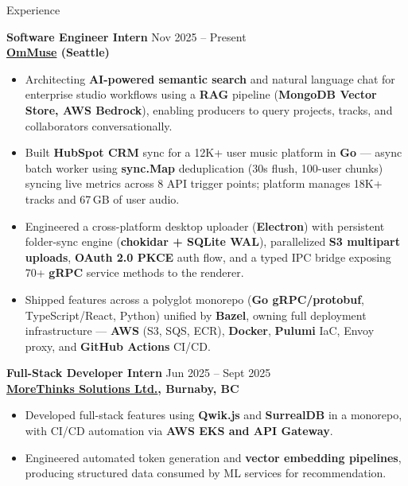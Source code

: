 \documentclass{resume}
\begin{document}
\begin{rSection}{Experience}

\scriptsize \textbf{Software Engineer Intern} \hfill Nov 2025 -- Present\\
\textbf{\href{https://ommuse.com/}{OmMuse} (Seattle)}
\begin{itemize}\itemsep -4pt
    \item Architecting \textbf{AI-powered semantic search} and natural language chat for enterprise studio workflows using a \textbf{RAG} pipeline (\textbf{MongoDB Vector Store, AWS Bedrock}), enabling producers to query projects, tracks, and collaborators conversationally.
    \item Built \textbf{HubSpot CRM} sync for a 12K+ user music platform in \textbf{Go} --- async batch worker using \textbf{sync.Map} deduplication (30s flush, 100-user chunks) syncing live metrics across 8 API trigger points; platform manages 18K+ tracks and 67\,GB of user audio.
    \item Engineered a cross-platform desktop uploader (\textbf{Electron}) with persistent folder-sync engine (\textbf{chokidar + SQLite WAL}), parallelized \textbf{S3 multipart uploads}, \textbf{OAuth 2.0 PKCE} auth flow, and a typed IPC bridge exposing 70+ \textbf{gRPC} service methods to the renderer.
    \item Shipped features across a polyglot monorepo (\textbf{Go gRPC/protobuf}, TypeScript/React, Python) unified by \textbf{Bazel}, owning full deployment infrastructure --- \textbf{AWS} (S3, SQS, ECR), \textbf{Docker}, \textbf{Pulumi} IaC, Envoy proxy, and \textbf{GitHub Actions} CI/CD.
\end{itemize}

\scriptsize \textbf{Full-Stack Developer Intern} \hfill Jun 2025 -- Sept 2025\\
  \textbf{\href{https://morethinks.com/}{MoreThinks Solutions Ltd.}, Burnaby, BC}
  \begin{itemize}\itemsep -4pt
    \item Developed full-stack features using \textbf{Qwik.js} and \textbf{SurrealDB} in a monorepo, with CI/CD automation via \textbf{AWS EKS and API Gateway}.
    \item Engineered automated token generation and \textbf{vector embedding pipelines}, producing structured data consumed by ML services for recommendation.
  \end{itemize}


\end{rSection}
\end{document}
